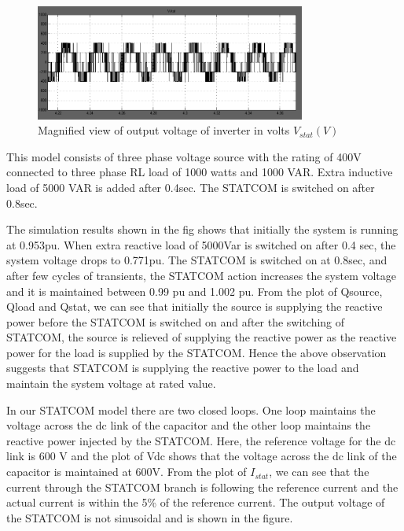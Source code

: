 \documentclass[journal,twoside]{IEEEtran}
\begin{document}
\begin{figure}[!ht]
\includegraphics[width=3.5in]{l}
\caption{Magnified view of output voltage of inverter in volts $V_{stat}(V)$}
\label{fl }
\end{figure}







This model consists of three phase voltage
source with the rating of 400V connected to
three phase RL load of 1000 watts and 1000 VAR.
Extra inductive load of 5000 VAR is added after
0.4sec. The STATCOM is switched on after
0.8sec.

\bigskip
The simulation results shown in the fig shows
that initially the system is running at 0.953pu.
When extra reactive load of 5000Var is switched
on after 0.4 sec, the system voltage drops to
0.771pu. The STATCOM is switched on at 0.8sec,
and after few cycles of transients, the STATCOM
action increases the system voltage and it is
maintained between 0.99 pu and 1.002 pu. From
the plot of Qsource, Qload and Qstat, we can see
that initially the source is supplying the reactive
power before the STATCOM is switched on and
after the switching of STATCOM, the source is relieved of supplying the reactive power as the
reactive power for the load is supplied by the
STATCOM. Hence the above observation
suggests that STATCOM is supplying the reactive
power to the load and maintain the system
voltage at rated value.

\bigskip
In our STATCOM model there are two closed
loops. One loop maintains the voltage across the
dc link of the capacitor and the other loop
maintains the reactive power injected by the
STATCOM. Here, the reference voltage for the dc
link is 600 V and the plot of Vdc shows that the
voltage across the dc link of the capacitor is
maintained at 600V. From the plot of $I_{stat}$, we
can see that the current through the STATCOM
branch is following the reference current and the
actual current is within the 5\% of the reference
current. The output voltage of the STATCOM is
not sinusoidal and is shown in the figure.
\end{document}

